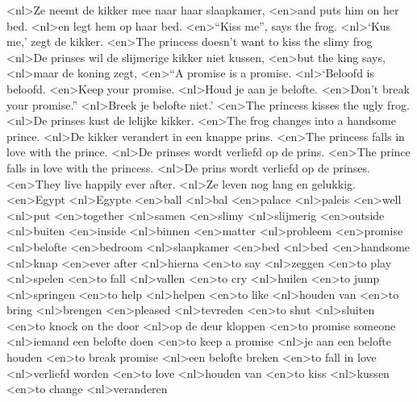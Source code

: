 <nl>Ze neemt de kikker mee naar haar slaapkamer,
<en>and puts him on her bed. 
<nl>en legt hem op haar bed.
<en>“Kiss me”, says the frog.
<nl>`Kus me,' zegt de kikker.
<en>The princess doesn’t want to kiss the slimy frog
<nl>De prinses wil de slijmerige kikker niet kussen,
<en>but the king says,
<nl>maar de koning zegt,
<en>“A promise is a promise.
<nl>`Beloofd is beloofd.
<en>Keep your promise.
<nl>Houd je aan je belofte.
<en>Don’t break your promise.”
<nl>Breek je belofte niet.'
<en>The princess kisses the ugly frog.
<nl>De prinses kust de lelijke kikker.
<en>The frog changes into a handsome prince.
<nl>De kikker verandert in een knappe prins.
<en>The princess falls in love  with the prince.
<nl>De prinses wordt verliefd op de prins.
<en>The prince falls in love with the princess.
<nl>De prins wordt verliefd op de prinses.
<en>They live happily ever after.
<nl>Ze leven nog lang en gelukkig.
<en>Egypt
<nl>Egypte
<en>ball
<nl>bal
<en>palace
<nl>paleis
<en>well
<nl>put
<en>together
<nl>samen
<en>slimy
<nl>slijmerig
<en>outside
<nl>buiten
<en>inside
<nl>binnen
<en>matter
<nl>probleem
<en>promise
<nl>belofte
<en>bedroom
<nl>slaapkamer
<en>bed
<nl>bed
<en>handsome
<nl>knap
<en>ever after
<nl>hierna
<en>to say
<nl>zeggen
<en>to play
<nl>spelen
<en>to fall
<nl>vallen
<en>to cry
<nl>huilen
<en>to jump
<nl>springen
<en>to help
<nl>helpen
<en>to like
<nl>houden van
<en>to bring
<nl>brengen
<en>pleased
<nl>tevreden
<en>to shut
<nl>sluiten
<en>to knock on the door
<nl>op de deur kloppen
<en>to promise someone
<nl>iemand een belofte doen
<en>to keep a promise
<nl>je aan een belofte houden
<en>to break promise
<nl>een belofte breken
<en>to fall in love
<nl>verliefd worden
<en>to love
<nl>houden van
<en>to kiss
<nl>kussen
<en>to change
<nl>veranderen
